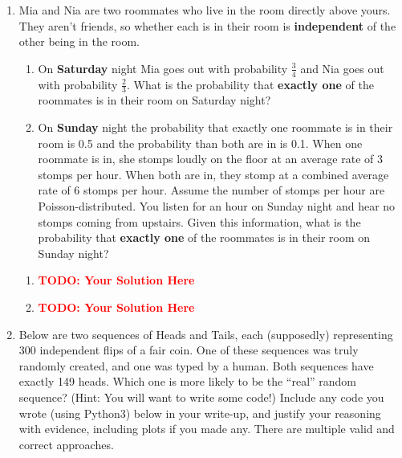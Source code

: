 \documentclass[12pt]{article}
\def\todo#1{\textcolor{red}{\textbf{#1}}}
\renewcommand{\|}{\mid}
\begin{document}
\begin{enumerate}
    \item Mia and Nia are two roommates who live in the room directly above yours. They aren't friends, so whether each is in their room is \textbf{independent} of the other being in the room.
    \begin{enumerate}
        \item On \textbf{Saturday} night Mia goes out with probability $\frac{3}{4}$ and Nia goes out with probability $\frac{2}{3}$. What is the probability that \textbf{exactly one} of the roommates is in their room on Saturday night?
        \item On \textbf{Sunday} night the probability that exactly one roommate is in their room is 0.5 and the probability than both are in is 0.1. When one roommate is in, she stomps loudly on the floor at an average rate of 3 stomps per hour. When both are in, they stomp at a combined average rate of 6 stomps per hour. Assume the number of stomps per hour are Poisson-distributed. You listen for an hour on Sunday night and hear no stomps coming from upstairs. Given this information, what is the probability that \textbf{exactly one} of the roommates is in their room on Sunday night?
    \end{enumerate}
    
\begin{tcolorbox}
\begin{enumerate}
\item \todo{TODO: Your Solution Here}
\item \todo{TODO: Your Solution Here}
\end{enumerate}
\end{tcolorbox}

\pagebreak
    \item Below are two sequences of Heads and Tails, each (supposedly) representing 300 independent flips of a fair coin. One of these sequences was truly randomly created, and one was typed by a human. Both sequences have exactly 149 heads. Which one is more likely to be the ``real'' random sequence? (Hint: You will want to write some code!) Include any code you wrote (using Python3) below in your write-up, and justify your reasoning with evidence, including plots if you made any. There are multiple valid and correct approaches.


\end{enumerate}
\end{document}
